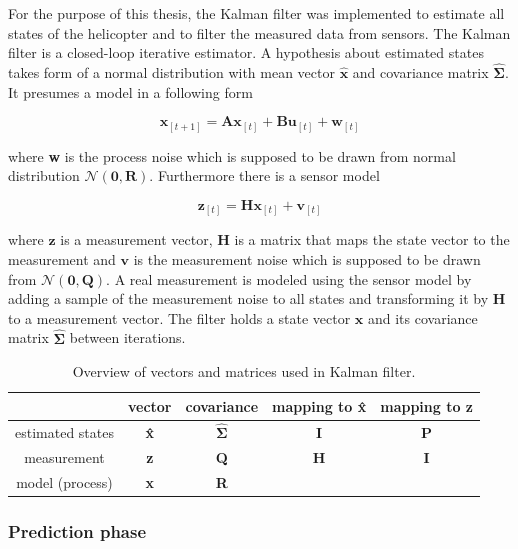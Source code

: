 For the purpose of this thesis, the Kalman filter was implemented to estimate all states of the helicopter and to filter the measured data from sensors. The Kalman filter is a closed-loop iterative estimator. A hypothesis about estimated states takes form of a normal distribution with mean vector $\hat{\textbf{x}}$ and covariance matrix $\hat{\boldsymbol{\Sigma}}$. It presumes a model in a following form

\begin{equation}
\textbf{x}_{[t+1]} = \textbf{A}\textbf{x}_{[t]} + \textbf{B}\textbf{u}_{[t]} + \textbf{w}_{[t]}
\label{eq:kalman_model}
\end{equation}

where \textbf{w} is the process noise which is supposed to be drawn from normal distribution $\mathcal{N}(\textbf{0}, \textbf{R})$. Furthermore there is a sensor model

\begin{equation}
\textbf{z}_{[t]} = \textbf{H}\textbf{x}_{[t]} + \textbf{v}_{[t]}
\end{equation}

where $\textbf{z}$ is a measurement vector, \textbf{H} is a matrix that maps the state vector to the measurement and $\textbf{v}$ is the measurement noise which is supposed to be drawn from $\mathcal{N}(\textbf{0}, \textbf{Q})$. A real measurement is modeled using the sensor model by adding a sample of the measurement noise to all states and transforming it by \textbf{H} to a measurement vector. The filter holds a state vector $\textbf{\^x}$ and its covariance matrix $\hat{\boldsymbol{\Sigma}}$ between iterations.

\begin{table}[h]
\centering
\begin{tabular}{ccccc}
\hline
& vector & covariance & mapping to \textbf{\^x} & mapping to \textbf{z}\\
\hline
estimated states & \textbf{\^x} & $\hat{\boldsymbol{\Sigma}}$ & \textbf{I} & \textbf{P}\\
measurement & \textbf{z} & \textbf{Q} & \textbf{H} & \textbf{I}\\
model (process) & \textbf{x} & \textbf{R} & & \\
\hline
\end{tabular}
\caption{Overview of vectors and matrices used in Kalman filter.}
\label{tab:matrices_in_kalman}
\end{table}

\subsubsection{Prediction phase}

